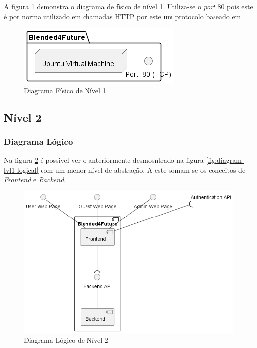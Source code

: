 A figura \ref{fig:diagram-lvl1-physical} demonstra o diagrama de físico de nível 1. Utiliza-se o \textit{port} 80 pois este é por norma utilizado em chamadas \Acrshort{HTTP} por este um protocolo baseado em 

\begin{figure}[h!tbp]
    \centering
    \includegraphics[width=0.5\linewidth]{capitulos/cap3-analisedoproblema/assets/arquiteturasistema/physical/physical_l1.png}
    \caption{Diagrama Físico de Nível 1}
    \label{fig:diagram-lvl1-physical}
\end{figure}





\subsection{Nível 2}

\subsubsection{Diagrama Lógico}

Na figura \ref{fig:diagram-lvl2-logical} é possivel ver o anteriormente desmosntrado na figura \ref{fig:diagram-lvl1-logical} com um menor nível de abstração.
A este somam-se os conceitos de \textit{Frontend} e \textit{Backend}.

\begin{figure}[h!tbp]
    \centering
    \includegraphics[width=0.7\linewidth]{capitulos/cap3-analisedoproblema/assets/arquiteturasistema/logical/logical_l2.png}
    \caption{Diagrama Lógico de Nível 2}
    \label{fig:diagram-lvl2-logical}
\end{figure}

